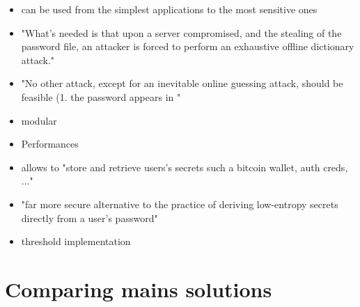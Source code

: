 \documentclass[../report.tex]{subfiles}
\begin{document}
\begin{itemize}
 
 
 \item can be used from the simplest applications to the most sensitive ones
 

 \item "What's needed is that upon a server compromised, and the stealing of the password file, an attacker is forced to perform an exhaustive offline dictionary attack."
 \item "No other attack, except for an inevitable online guessing attack, should be feasible (1. the password appears in "
 
 
 
 
 \item modular
 \item Performances
 
 \item allows to "store and retrieve users's secrets such a bitcoin wallet, auth creds, ..."
 
 \item "far more secure alternative to the practice of deriving low-entropy secrets directly from a user's password"
 
 \item threshold implementation
\end{itemize}


\section{Comparing mains solutions}
\end{document}
